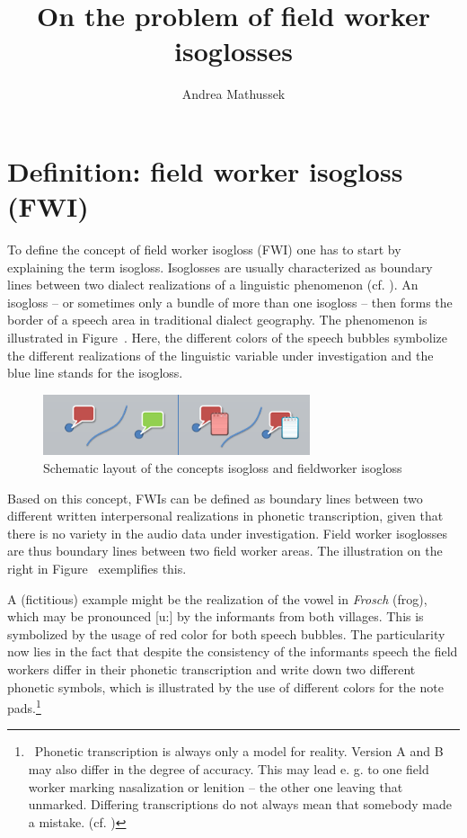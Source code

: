 \documentclass[output=paper]{LSP/langsci}
\author{Andrea Mathussek\affiliation{Albert-Ludwigs-University Freiburg}}
\title{On the problem of field worker isoglosses}
\begin{document}
% 
% 

\section{Definition: field worker isogloss (FWI)}
To define the concept of {\textquotedbl}field worker isogloss{\textquotedbl} (FWI) one has to start by explaining the term {\textquotedbl}isogloss{\textquotedbl}. Isoglosses are usually characterized as boundary lines between two dialect realizations of a linguistic phenomenon (cf. \citealt[296--297]{gluck_metzler_2005}). An isogloss – or sometimes only a bundle of more than one isogloss – then forms the border of a speech area in traditional dialect geography. The phenomenon is illustrated in Figure~. Here, the different colors of the speech bubbles symbolize the different realizations of the linguistic variable under investigation and the blue line stands for the isogloss.

\begin{figure}
\includegraphics[width=0.7\textwidth]{illustrations/mathus_fig1}
\caption{Schematic layout of the concepts {\textquotedbl}isogloss{\textquotedbl} and {\textquotedbl}fieldworker isogloss{\textquotedbl}}
\label{fig:1}
\end{figure}

Based on this concept, FWIs can be defined as boundary lines between two different written interpersonal realizations in phonetic transcription, given that there is no variety in the audio data under investigation. Field worker isoglosses are thus boundary lines between two field worker areas. The illustration on the right in Figure~ exemplifies this.

A (fictitious) example might be the realization of the vowel in \textit{Frosch} ({\textquotesingle}frog{\textquotesingle}), which may be pronounced [u:] by the informants from both villages. This is symbolized by the usage of red color for both speech bubbles. The particularity now lies in the fact that despite the consistency of the informants{\textquotesingle} speech the field workers differ in their phonetic transcription and write down two different phonetic symbols, which is illustrated by the use of different colors for the note pads.\footnote{\ Phonetic transcription is always only a model for reality. Version A and B may also differ in the degree of accuracy. This may lead e. g. to one field worker marking nasalization or lenition – the other one leaving that unmarked. Differing transcriptions do not always mean that somebody made a mistake. (cf. \citealt[41--69]{mathussek_sprachraume_2014})}
\end{document}
